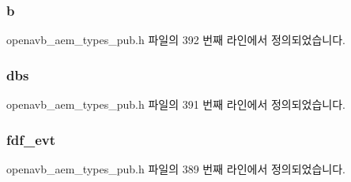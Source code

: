 \subsubsection[{\texorpdfstring{b}{b}}]{ b}\hypertarget{structopenavb__aem__stream__format__iec__61883__6__float__t_a8921ab436782828cd4262390e8b01eb7}{}\label{structopenavb__aem__stream__format__iec__61883__6__float__t_a8921ab436782828cd4262390e8b01eb7}


openavb\+\_\+aem\+\_\+types\+\_\+pub.\+h 파일의 392 번째 라인에서 정의되었습니다.

\subsubsection[{\texorpdfstring{dbs}{dbs}}]{ dbs}\hypertarget{structopenavb__aem__stream__format__iec__61883__6__float__t_abed3ffe3c3261fb920ef333f76a290bd}{}\label{structopenavb__aem__stream__format__iec__61883__6__float__t_abed3ffe3c3261fb920ef333f76a290bd}


openavb\+\_\+aem\+\_\+types\+\_\+pub.\+h 파일의 391 번째 라인에서 정의되었습니다.

\subsubsection[{\texorpdfstring{fdf\+\_\+evt}{fdf_evt}}]{ fdf\+\_\+evt}\hypertarget{structopenavb__aem__stream__format__iec__61883__6__float__t_a5face0fe6e253b8041386eaa28f73800}{}\label{structopenavb__aem__stream__format__iec__61883__6__float__t_a5face0fe6e253b8041386eaa28f73800}


openavb\+\_\+aem\+\_\+types\+\_\+pub.\+h 파일의 389 번째 라인에서 정의되었습니다.

